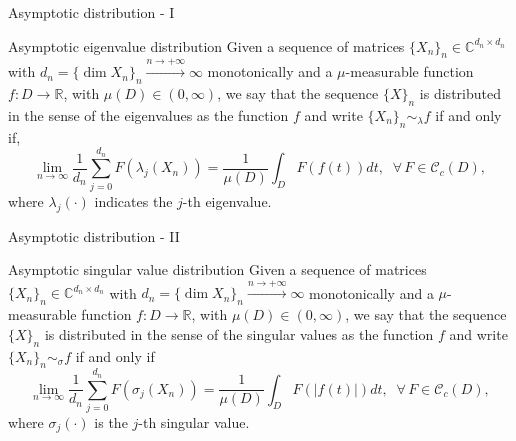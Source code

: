 \documentclass[aspectratio=169,xcolor=dvipsnames]{beamer}
\begin{document}
\begin{frame}{Asymptotic distribution - I}
\begin{block}{Asymptotic eigenvalue distribution}
Given a sequence of matrices
$\{X_n\}_n \in \mathbb{C}^{d_n\times d_n}$
with $d_n = \{\dim X_n\}_n \overset{ n \rightarrow
	+\infty}{\longrightarrow} \infty$ monotonically and a
$\mu$-measurable function $f : D \rightarrow \mathbb{R}$, with
$\mu(D) \in (0,\infty)$, we say that the sequence $\{X\}_n$ is
distributed  in the sense of the eigenvalues as the function $f$ and
write $\{X_n\}_n \sim_{\lambda} f$ if and only if,
\begin{equation*}
	\lim_{n \rightarrow \infty} \frac{1}{d_n} \sum_{j = 0}^{d_n}
	F(\lambda_j(X_n)) = \frac{1}{\mu(D)} \int_{D}F(f(t))dt, \;\; \forall
	\, F \in \mathcal{C}_c(D),
\end{equation*}
where $\lambda_j(\cdot)$ indicates the $j$-th eigenvalue.
\end{block}
\end{frame}

\begin{frame}{Asymptotic distribution - II}

\begin{block}{Asymptotic singular value distribution}
    Given a sequence of matrices $\{X_n\}_n \in \mathbb{C}^{d_n \times
	d_n}$
with $d_n = \{\dim X_n\}_n \overset{ n \rightarrow
	+\infty}{\longrightarrow} \infty$ monotonically and a $\mu$-measurable
function $f : D \rightarrow \mathbb{R}$, with $\mu(D) \in (0,\infty)$,
we say that the sequence $\{X\}_n$ is distributed
in the sense of the singular values as the function $f$ and write
$\{X_n\}_n \sim_{\sigma} f$ if and only if
\begin{equation*}
	\lim_{n \rightarrow \infty} \frac{1}{d_n} \sum_{j = 0}^{d_n}
	F(\sigma_j(X_n)) = \frac{1}{\mu(D)} \int_{D}F(|f(t)|)dt, \;\; \forall
	\, F \in \mathcal{C}_c(D),
\end{equation*}
where $\sigma_j(\cdot)$ is the $j$-th singular value.
\end{block}

\end{frame}
\end{document}
